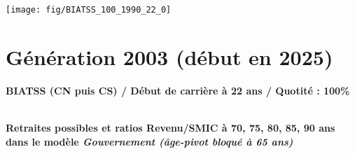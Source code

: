  \vspace{0.1cm} 

 {\hspace{-2.2cm}\texttt{[image: fig/BIATSS\_100\_1990\_22\_0]}} 

\newpage 
 
\section{Génération 2003 (début en 2025)\label{BIATSS_100_2003_22_0}} 
 
{\bf \noindent BIATSS (CN puis CS) / Début de carrière à 22 ans / Quotité : 100\%}  ~ 

 ~\\{\bf \noindent Retraites possibles et ratios Revenu/SMIC à 70, 75, 80, 85, 90 ans dans le modèle \emph{Gouvernement (âge-pivot bloqué à 65 ans)}}  
 
